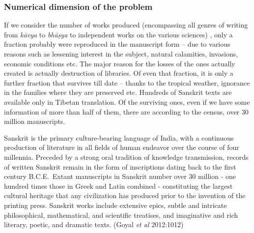 \newpage

\subsubsection{Numerical dimension of the problem}

{\leftskip=10pt\par}


If we consider the number of works produced (encompassing all genres of writing from {\sl kāvya} to {\sl bhāṣya} to independent works on the various sciences) , only a fraction probably were reproduced in the manuscript form – due to various reasons such as lessening interest in the subject, natural calamities, invasions, economic conditions etc. The major reason for the losses of the ones actually created is actually destruction of libraries.  Of even that fraction, it is only a further fraction that survives till date – thanks to the tropical weather, ignorance in the families where they are preserved etc. Hundreds of Sanskrit texts are available only in Tibetan translation. Of the surviving ones, even if we have some information of more than half of them, there are according to the census, over 30 million manuscripts. 
\begin{myquote}
\eleven
Sanskrit is the primary culture-bearing language of India, with a continuous production of literature in all fields of human endeavor over the course of four millennia. Preceded by a strong oral tradition of knowledge transmission, records of written Sanskrit remain in the form of inscriptions dating back to the first century B.C.E.\ Extant manuscripts in Sanskrit number over 30 million - one hundred times those in Greek and Latin combined - constituting the largest cultural heritage that any civilization has produced prior to the invention of the printing press. Sanskrit works include extensive epics, subtle and intricate philosophical, mathematical, and scientific treatises, and imaginative and rich literary, poetic, and dramatic texts.	\hfill (Goyal {\sl et al} 2012:1012)
\end{myquote}

